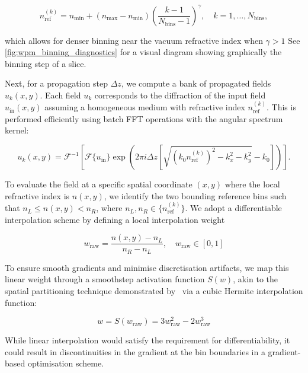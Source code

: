 \documentclass[preprint,12pt,number]{elsarticle}
\begin{document}
\begin{equation}
\label{eq:wpm_bin_spacing}
n_{\mathrm{ref}}^{(k)}
=
n_{\mathrm{min}}
+
(n_{\mathrm{max}} - n_{\mathrm{min}})
\left( \frac{k-1}{N_{\mathrm{bins}}-1} \right)^\gamma,
\quad
k=1,\ldots,N_{\mathrm{bins}},
\end{equation}

which allows for denser binning near the vacuum refractive index when $\gamma > 1$ See \ref{fig:wpm_binning_diagnostics} for 
a visual diagram showing graphically the binning step of a slice.

Next, for a propagation step $\Delta z$, we compute a bank of propagated fields
$u_k(x,y)$. Each field $u_k$ corresponds to the diffraction of the input field
$u_{\mathrm{in}}(x,y)$ assuming a homogeneous medium with refractive index
$n_{\mathrm{ref}}^{(k)}$. This is performed efficiently using batch FFT
operations with the angular spectrum kernel:

\begin{equation}
\label{eq:wpm_binned_fields}
u_k(x,y)
=
\mathcal{F}^{-1}
\left[
\mathcal{F}\{u_{\mathrm{in}}\}
\exp\left(
2\pi i \Delta z
\left[\sqrt{(k_0 n_{\mathrm{ref}}^{(k)})^2-k_x^2-k_y^2}-k_0\right]
\right)
\right].
\end{equation}

To evaluate the field at a specific spatial coordinate $(x,y)$ where the local
refractive index is $n(x,y)$, we identify the two bounding reference bins such
that $n_L \le n(x,y) < n_R$, where
$n_L,n_R \in \{n_{\mathrm{ref}}^{(k)}\}$. We adopt a differentiable interpolation
scheme by defining a local interpolation weight

\begin{equation}
\label{eq:wpm_raw_weight}
w_{\mathrm{raw}} = \frac{n(x,y) - n_L}{n_R - n_L}, \quad w_{\mathrm{raw}} \in [0, 1]
\end{equation}

To ensure smooth gradients and minimise discretisation artifacts, we map this
linear weight through a smoothstep activation function $S(w)$, akin to the
spatial partitioning technique demonstrated by~\cite{BarreBrunel2025} via a cubic
Hermite interpolation function:

\begin{equation}
\label{eq:wpm_smoothstep}
w = S(w_{\mathrm{raw}}) = 3w_{\mathrm{raw}}^2 - 2w_{\mathrm{raw}}^3
\end{equation}

While linear interpolation would satisfy the requirement for differentiability,
it could result in discontinuities in the gradient at the bin boundaries in a
gradient-based optimisation scheme.
\end{document}
